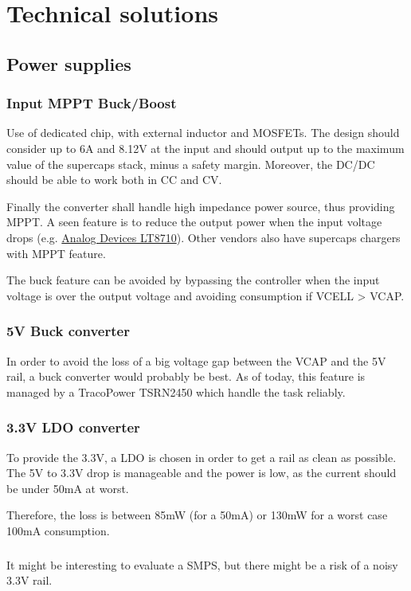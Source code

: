 \chapter{Technical solutions}
\section{Power supplies}
\subsection{Input MPPT Buck/Boost}
Use of dedicated chip, with external inductor and MOSFETs.
The design should consider up to 6A and 8.12V at the input and should output up to the maximum value of the supercaps stack, minus a safety margin.
Moreover, the DC/DC should be able to work both in CC and CV.

Finally the converter shall handle high impedance power source, thus providing MPPT.
A seen feature is to reduce the output power when the input voltage drops (e.g. \href{https://www.analog.com/en/products/lt8710.html}{Analog Devices LT8710}).
Other vendors also have supercaps chargers with MPPT feature.

The buck feature can be avoided by bypassing the controller when the input voltage is over the output voltage and avoiding consumption if VCELL > VCAP.

\subsection{5V Buck converter}
In order to avoid the loss of a big voltage gap between the VCAP and the 5V rail, a buck converter would probably be best.
As of today, this feature is managed by a TracoPower TSRN2450 which handle the task reliably.

\subsection{3.3V LDO converter}
To provide the 3.3V, a LDO is chosen in order to get a rail as clean as possible.
The 5V to 3.3V drop is manageable and the power is low, as the current should be under 50mA at worst.

Therefore, the loss is between 85mW (for a 50mA) or 130mW for a worst case 100mA consumption.

\paragraph{}
It might be interesting to evaluate a SMPS, but there might be a risk of a noisy 3.3V rail.

